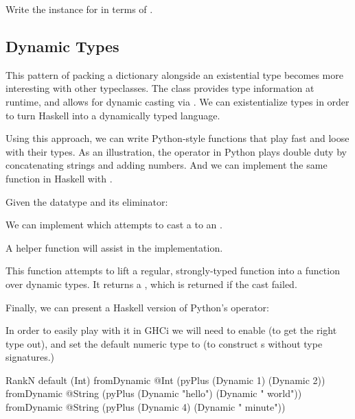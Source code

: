\documentclass[book.tex]{subfiles}
\begin{document}

\begin{exercise}
Write the  instance for  in terms of
.
\end{exercise}
\begin{solution}
\end{solution}


\subsection{Dynamic Types}

This pattern of packing a dictionary alongside an existential type becomes more
interesting with other typeclasses. The  class provides type
information at runtime, and allows for dynamic casting via . We can existentialize  types in
order to turn Haskell into a dynamically typed language.

Using this approach, we can write Python-style functions that play fast and
loose with their types. As an illustration, the \json{+} operator in Python
plays double duty by concatenating strings and adding numbers. And we can
implement the same function in Haskell with .

Given the datatype and its eliminator:


We can implement  which attempts to cast a  to an
.


A helper function will assist in the implementation.


This function attempts to lift a regular, strongly-typed function into a
function over dynamic types. It returns a , which is returned
if the cast failed.

Finally, we can present a Haskell version of Python's \json{+} operator:


In order to easily play with it in GHCi we will need to enable
 (to get the right type out), and set the default numeric
type to  (to construct s without type signatures.)

\begin{dorepl}{RankN}
default (Int)
fromDynamic @Int (pyPlus (Dynamic 1) (Dynamic 2))
fromDynamic @String (pyPlus (Dynamic "hello") (Dynamic " world"))
fromDynamic @String (pyPlus (Dynamic 4) (Dynamic " minute"))
\end{dorepl}
\end{document}
